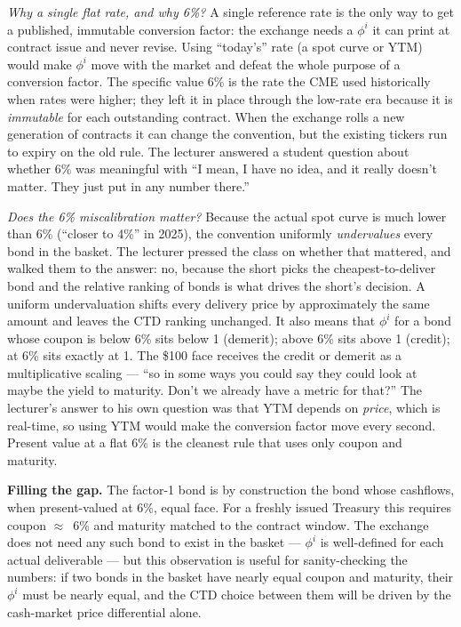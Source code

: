 \emph{Why a single flat rate, and why 6\%?} A single reference rate is the
only way to get a published, immutable conversion factor: the exchange
needs a $\phi^i$ it can print at contract issue and never revise. Using
``today's'' rate (a spot curve or YTM) would make $\phi^i$ move with the
market and defeat the whole purpose of a conversion factor. The specific
value 6\% is the rate the CME used historically when rates were higher;
they left it in place through the low-rate era because it is
\emph{immutable} for each outstanding contract. When the exchange rolls a
new generation of contracts it can change the convention, but the existing
tickers run to expiry on the old rule. The lecturer answered a student
question about whether 6\% was meaningful with ``I mean, I have no idea,
and it really doesn't matter. They just put in any number there.''

\emph{Does the 6\% miscalibration matter?} Because the actual spot curve
is much lower than 6\% (``closer to 4\%'' in 2025), the convention
uniformly \emph{undervalues} every bond in the basket. The lecturer
pressed the class on whether that mattered, and walked them to the
answer: no, because the short picks the cheapest-to-deliver bond and the
relative ranking of bonds is what drives the short's decision. A uniform
undervaluation shifts every delivery price by approximately the same
amount and leaves the CTD ranking unchanged. It also means that $\phi^i$
for a bond whose coupon is below 6\% sits below 1 (demerit); above 6\%
sits above 1 (credit); at 6\% sits exactly at 1. The \$100 face receives
the credit or demerit as a multiplicative scaling --- ``so in some ways you
could say they could look at maybe the yield to maturity. Don't we already
have a metric for that?'' The lecturer's answer to his own question was
that YTM depends on \emph{price}, which is real-time, so using YTM would
make the conversion factor move every second. Present value at a flat 6\%
is the cleanest rule that uses only coupon and maturity.

\begin{tipblock}
\textbf{Filling the gap.} The factor-1 bond is by construction the bond
whose cashflows, when present-valued at 6\%, equal face. For a freshly
issued Treasury this requires coupon $\approx$~6\% and maturity matched to
the contract window. The exchange does not need any such bond to exist in
the basket --- $\phi^i$ is well-defined for each actual deliverable --- but
this observation is useful for sanity-checking the numbers: if two bonds
in the basket have nearly equal coupon and maturity, their $\phi^i$ must
be nearly equal, and the CTD choice between them will be driven by the
cash-market price differential alone.
\end{tipblock}

